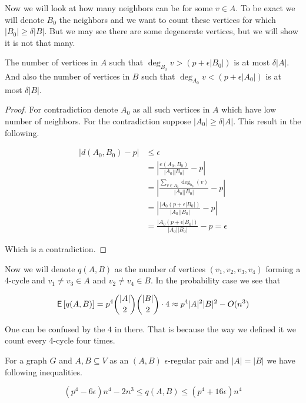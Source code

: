 Now we will look at how many neighbors can be for some $v \in A$. To be exact we will denote $B_{0}$ the neighbors and we want to count these vertices for which $|B_{0}| \geq \delta |B|$. But we may see there are some degenerate vertices, but we will show it is not that many.

\begin{lemma}
	The number of vertices in $A$ such that $\deg_{B_{0}}v > (p + \epsilon |B_{0}|)$ is at most $\delta |A|$. And also the number of vertices in $B$ such that $\deg_{A_{0}}v < (p + \epsilon |A_{0}|)$ is at most $\delta |B|$.
\end{lemma}

\begin{proof}
	For contradiction denote $A_{0}$ as all such vertices in $A$ which have low number of neighbors. For the contradiction suppose $|A_{0}| \geq \delta |A|$. This result in the following.
	
	$$
	\begin{aligned}
		|d(A_{0}, B_{0}) - p| &\leq \epsilon \\
		 &= \left| \frac{e(A_{0},B_{0})}{|A_{0}| |B_{0}|} - p \right| \\
		 &= \left| \frac{\sum_{v \in A_{0}} \deg_{b_{0}}(v)}{|A_{0}| |B_{0}|} - p \right| \\
		 &= \left| \frac{|A_{0} (p+ \epsilon |B_{0}|)}{|A_{0}| |B_{0}|} - p \right| \\
		 &= \frac{|A_{0} (p+ \epsilon |B_{0}|)}{|A_{0}| |B_{0}|} - p = \epsilon
	\end{aligned}
	$$
	
	Which is a contradiction.
\end{proof}

Now we will denote $q(A,B)$ as the number of vertices $(v_1, v_2, v_3, v_4)$ forming a 4-cycle and $v_1 \neq v_3 \in A$ and $v_2 \neq v_4 \in B$. In the probability case we see that 

$$
\operatorname{\textsf{E}\,} [q(A,B)] = p^4 \binom{|A|}{2} \binom{|B|}{2} \cdot 4 \approx p^4 |A|^2 |B|^2 - O(n^3)
$$

One can be confused by the $4$ in there. That is because the way we defined it we count every 4-cycle four times.

\begin{lemma}
	For a graph $G$ and $A, B \subseteq V$ as an $(A, B)$ $\epsilon$-regular pair and $|A| = |B|$ we have following inequalities.
	
	$$
	(p^4 - 6 \epsilon)n^4 - 2n^3 \leq q(A,B) \leq (p^4 + 16 \epsilon) n^4
	$$
\end{lemma}

